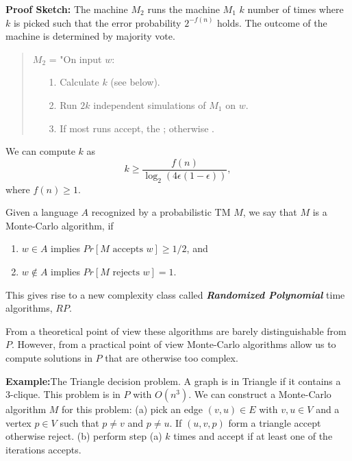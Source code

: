 \documentclass[a4paper,blends,pdf,colorBG,slideColor]{prosper}
\begin{document}


{\bf Proof Sketch:} The machine $M_2$ runs the machine $M_1$ $k$ number of times where $k$ is
picked such that the error probability $2^{-f(n)}$ holds.  The outcome of the machine is determined by
majority vote.
\begin{quote}
$M_2$ = "On input $w$:
\begin{itemize}
\item[1.] Calculate $k$ (see below).
\item[2.] Run $2k$ independent simulations of $M_1$ on $w$.
\item[3.] If most runs accept, the \accept; otherwise \reject.
\end{itemize}
\end{quote}
We can compute $k$ as
\[
k \ge \frac{f(n)}{\log_2(4\epsilon(1-\epsilon))},
\]
where $f(n) \ge 1$.
\es


\vspace{.2in}
Given a language $A$ recognized by  a probabilistic TM $M$, we say that $M$ is a Monte-Carlo algorithm, if
\begin{enumerate}
\item $w \in A$ implies $Pr[\text{$M$ accepts $w$}] \ge 1/2$, and
\item $w \not\in A$ implies $Pr[\text{$M$ rejects $w$}] = 1$.
\end{enumerate}

This gives rise to a new complexity class called {\em\bf Randomized Polynomial} time algorithms, $RP$.


From a theoretical point of view these algorithms are barely distinguishable from $P$.  However, from a
practical point of view Monte-Carlo algorithms allow us to compute solutions in $P$ that are otherwise too complex.
\es

\small
{\bf Example:}The Triangle decision problem.  A graph is in Triangle if it contains a 3-clique.
This problem is in $P$ with $O(n^3)$.  We can construct a Monte-Carlo algorithm $M$ for this problem: (a) pick an edge $(v,u) \in E$ with $v,u\in V$ and a vertex $p\in V$
such that $p \ne v$ and $p \ne u$.  If $(u,v,p)$ form a triangle accept otherwise reject.  (b) perform step (a) $k$ times and accept if at least one of the iterations accepts.
\end{document}
